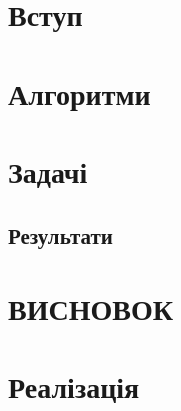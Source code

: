 \documentclass[a4paper,14pt,openany,twoside,oldfontcommands]{memoir}
\begin{document}

\newpage

\setcounter{page}{2}


\newpage

\setcounter{tocdepth}{3}
\tableofcontents*
\newpage

\chapter{Вступ}


\chapter{Алгоритми}


\chapter{Задачі}


\begin{landscape}
\chapter{Результати}

\end{landscape}

\chapter[Висновок]{\MakeUppercase{Висновок}}


\newpage
\nocite{*}



\appendix

\renewcommand\thechapter{Додаток А}

\chapter{Реалізація}
\renewcommand\thechapter{A}


\end{document}
